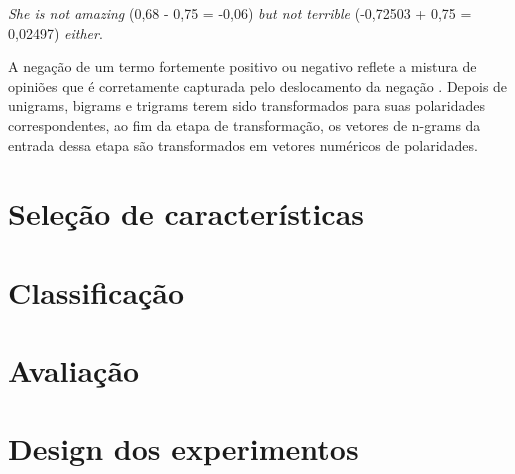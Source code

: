 \begin{example}
\textit{She is not amazing} (0,68 - 0,75 = -0,06) \textit{but not terrible} (-0,72503 + 0,75 = 0,02497) \textit{either}.
\label{ex:shift_1}
\end{example}

A negação de um termo fortemente positivo ou negativo reflete a mistura de opiniões que é corretamente capturada pelo deslocamento da negação \cite{taboada2011lexicon}. Depois de unigrams, bigrams e trigrams terem sido transformados para suas polaridades correspondentes, ao fim da etapa de transformação, os vetores de n-grams da entrada dessa etapa são transformados em vetores numéricos de polaridades.  

\section{Seleção de características}

\section{Classificação}

\section{Avaliação}

\section{Design dos experimentos}
